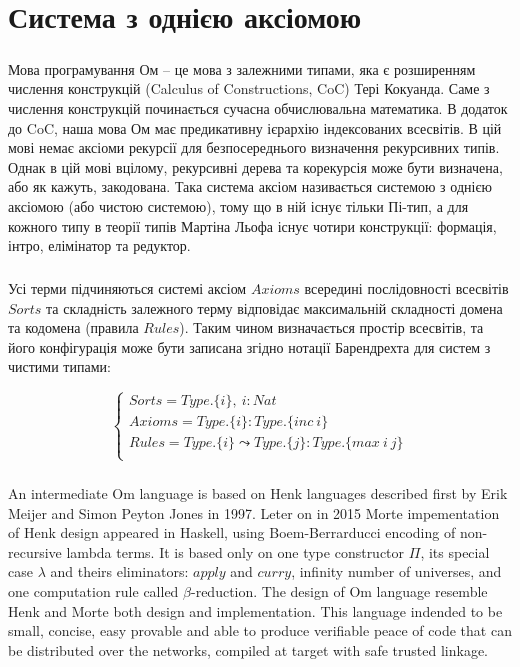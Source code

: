 \chapter{Система з однією аксіомою}

   \paragraph{}
   Мова програмування Ом -- це мова з залежними типами, яка є розширенням
   числення конструкцій (Calculus of Constructions, CoC) Тері Кокуанда. Саме з числення
   конструкцій починається сучасна обчислювальна математика. В додаток до CoC,
   наша мова Ом має предикативну ієрархію індексованих всесвітів. В цій мові немає
   аксіоми рекурсії для безпосереднього визначення рекурсивних типів. Однак в цій мові
   вцілому, рекурсивні дерева та корекурсія може бути визначена, або як кажуть, закодована.
   Така система аксіом називається системою з однією аксіомою (або чистою системою), тому що в ній
   існує тільки Пі-тип, а для кожного типу в теорії типів Мартіна Льофа існує чотири
   конструкції: формація, інтро, елімінатор та редуктор.

   \paragraph{}
   Усі терми підчиняються системі аксіом $Axioms$ всередині послідовності всесвітів $Sorts$
   та складність залежного терму відповідає максимальній складності домена та кодомена (правила $Rules$).
   Таким чином визначається простір всесвітів, та його конфігурація може бути записана
   згідно нотації Барендрехта для систем з чистими типами:

$$
\begin{cases}
    Sorts = Type.\{i\},\ i : Nat\\
    Axioms = Type.\{i\} : Type.\{inc\ i\}\\
    Rules = Type.\{i\} \leadsto Type.\{j\} : Type.\{max\ i\ j\}\\
\end{cases}
$$

\newpage
   \paragraph{}
   An intermediate Om language is based on Henk\cite{henk} languages described first
   by Erik Meijer and Simon Peyton Jones in 1997. Leter on in 2015 Morte impementation
   of Henk design appeared in Haskell, using Boem-Berrarducci encoding of non-recursive lambda terms.
   It is based only on one type constructor $\Pi$, its special case $\lambda$ and theirs eliminators:
   $apply$ and $curry$, infinity number of universes,
   and one computation rule called $\beta$-reduction.
   The design of Om language resemble Henk and Morte both
   design and implementation. This language indended to be small, concise, easy provable
   and able to produce verifiable peace of code that can be distributed over the networks,
   compiled at target with safe trusted linkage.

